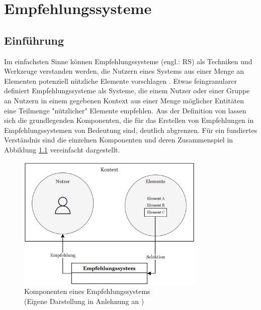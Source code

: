 
\chapter{Empfehlungssysteme}
\label{ch:empfehlungssysteme}

\section{Einführung}
\label{ch:empfehlungssysteme:einführung}
Im einfachsten Sinne können Empfehlungssysteme (engl.: \ac{RS}) als Techniken und Werkzeuge verstanden werden, die Nutzern eines Systems aus einer Menge an Elementen potenziell nützliche Elemente vorschlagen \cite[S. 10]{ricci:book}.
Etwas feingranularer definiert \textcite[S. 1]{klahold:book} Empfehlungssysteme als Systeme, die einem Nutzer oder einer Gruppe an Nutzern in einem gegebenen Kontext aus einer Menge möglicher Entitäten eine Teilmenge "nützlicher" Elemente empfehlen.
Aus der Definition von \textcite[S. 1]{klahold:book} lassen sich die grundlegenden Komponenten, die für das Erstellen von Empfehlungen in Empfehlungssystemen von Bedeutung sind, deutlich abgrenzen.
Für ein fundiertes Verständnis sind die einzelnen Komponenten und deren Zusammenspiel in Abbildung \ref{fig:empfehlungssysteme:einführung:abb1} vereinfacht dargestellt.

\begin{figure}[H]
    \centering
	\includegraphics[width=0.8\textwidth]{gfx/komponenten-empfehlungssystem.png}
	\caption[Komponenten eines Empfehlungssystems]{Komponenten eines Empfehlungssystems\\
	(Eigene Darstellung in Anlehnung an \cite[S. 2]{klahold:book})}
	\label{fig:empfehlungssysteme:einführung:abb1}
\end{figure}

